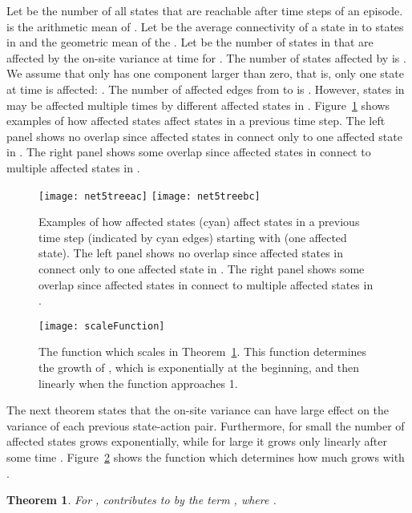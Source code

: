 \documentclass{article}
\newtheorem{theoremA}{Theorem}
\begin{document}
\begin{appendices}
Let  be the number of all states  that are reachable after  time steps
of an episode.
 is the arithmetic mean of .
Let  be the
average connectivity of a state in  to states in  and
 the geometric mean of
the .
Let  be the number of states in  that are affected by the
on-site variance  at time  
for .
The number of states affected by  is .
We assume that  only has one component larger than zero, that
is, only one state at time  is affected: .
The number of affected edges from  to  is .
However, states in  may be affected multiple times by different
affected states in .
Figure~\ref{fig:affectedStates} shows examples of how affected states affect states in a
previous time step. The left panel shows no overlap
since affected states in  connect only to
one affected state in . The right panel shows some overlap
since affected states in  connect to multiple
affected states in .

\begin{figure}[htp]
\centering
\texttt{[image: net5treeac]}
\texttt{[image: net5treebc]}
\caption{Examples of how affected states (cyan) affect states in a
  previous time step (indicated by cyan edges) starting with 
  (one affected state).  The left panel shows no overlap
  since affected states in  connect only to
  one affected state in . The right panel shows some overlap
  since affected states in  connect to multiple
  affected states in .
\label{fig:affectedStates}}
\end{figure}


\begin{figure}[htb]
\centering
\texttt{[image: scaleFunction]}
\caption{The function  which scales  in
    Theorem~\ref {th:Aaffect}. This function determines the growth of
    , which is exponentially at the beginning, and then linearly
    when the function approaches 1.
\label{fig:growth}}
\end{figure}



The next theorem states that the on-site
variance  can have large effect on the variance of
each previous state-action pair. 
Furthermore, for small  the number of affected
states grows exponentially, while for large  it grows only 
linearly after some time . Figure~\ref{fig:growth} shows the
function which determines how much  grows with . 

\begin{theoremA}
\label{th:Aaffect}
  For ,  contributes to 
  by the term , where .


\end{theoremA}
\end{appendices}
\end{document}
